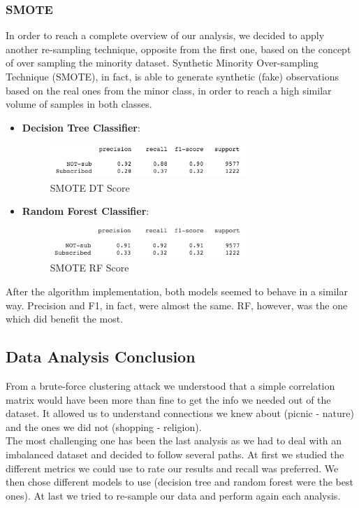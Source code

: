 \clearpage
\subsubsection{SMOTE}
In order to reach a complete overview of our analysis, we decided to apply another re-sampling technique, opposite from the first one, based on the concept of over sampling the minority dataset. Synthetic Minority Over-sampling Technique (SMOTE), in fact, is able to generate synthetic (fake) observations based on the real ones from the minor class, in order to reach a high similar volume of samples in both classes.

\begin{itemize}
\item \textbf{Decision Tree Classifier}: 

\begin{figure}[H]
\centering
\includegraphics[width=0.7\textwidth]{Img/smote_tree.png}
\caption{SMOTE DT Score}
\end{figure}
\item \textbf{Random Forest Classifier}: 

\begin{figure}[H]
\centering
\includegraphics[width=0.7\textwidth]{Img/smote_forest.png}
\caption{SMOTE RF Score}
\end{figure}
\end{itemize}

\noindent After the algorithm implementation, both models seemed to behave in a similar way. Precision and F1, in fact, were almost the same. RF, however, was the one which did benefit the most.
\clearpage
\subsection{Data Analysis Conclusion}
From a brute-force clustering attack we understood that a simple correlation matrix would have been more than fine to get the info we needed out of the dataset. It allowed us to understand connections we knew about (picnic - nature) and the ones we did not (shopping - religion).\\
The most challenging one has been the last analysis as we had to deal with an imbalanced dataset and decided to follow several paths. At first we studied the different metrics we could use to rate our results and recall was preferred. We then chose different models to use (decision tree and random forest were the best ones). At last we tried to re-sample our data and perform again each analysis.

